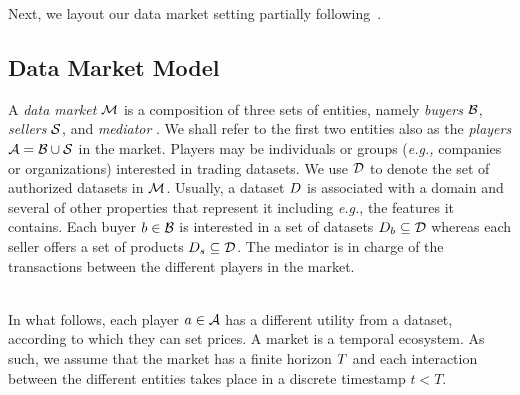 

Next, we layout our data market setting partially following~\cite{castro2020data}.

\subsection{Data Market Model}\label{sec:market_model}

A \emph{data market} $\mathcal{M}$ is a composition of three sets of entities, namely \emph{buyers} $\mathcal{B}$, \emph{sellers} $\mathcal{S}$, and \emph{mediator} \mediator. We shall refer to the first two entities also as the \emph{players} $\mathcal{A} = \mathcal{B}\cup\mathcal{S}$ in the market. Players may be individuals or groups (\emph{e.g.,} companies or organizations) interested in trading datasets. We use $\mathcal{D}$ to denote the set of authorized datasets in $\mathcal{M}$. Usually, a dataset $D$ is associated with a domain and several of other properties that represent it including \emph{e.g.}, the features it contains. Each buyer $b\in\mathcal{B}$ is interested in a set of datasets $D_{b}\subseteq\mathcal{D}$ whereas each seller offers a set of products $D_{s}\subseteq\mathcal{D}$. The mediator is in charge of the transactions between the different players in the market.

\\

In what follows, each player $a\in\mathcal{A}$ has a different utility from a dataset, according to which they can set prices. A market is a temporal ecosystem. As such, we assume that the market has a finite horizon $T$ and each interaction between the different entities takes place in a discrete timestamp $t<T$.

